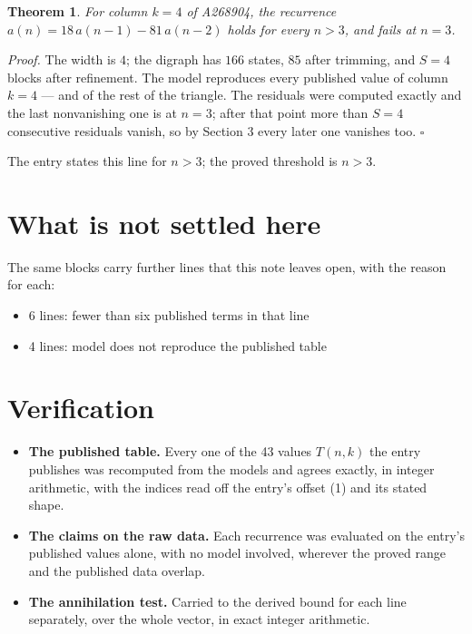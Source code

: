 \documentclass[11pt]{article}
\newtheorem{theorem}{Theorem}
\theoremstyle{definition}
\begin{document}
\begin{theorem} For column $k = 4$ of A268904, the recurrence $a(n) = 18\,a(n-1) - 81\,a(n-2)$ holds for every $n > 3$, and fails at $n = 3$.\end{theorem}

{\itshape Proof.} The width is $4$; the digraph has $166$ states, $85$ after trimming, and $S = 4$ blocks after refinement. The model reproduces every published value of column $k = 4$ --- and of the rest of the triangle. The residuals were computed exactly and the last nonvanishing one is at $n = 3$; after that point more than $S = 4$ consecutive residuals vanish, so by Section 3 every later one vanishes too. $\square$

The entry states this line for $n > 3$; the proved threshold is $n > 3$.

\section{What is not settled here}

The same blocks carry further lines that this note leaves open, with the reason for each:

\begin{itemize}

\item 6 lines: fewer than six published terms in that line

\item 4 lines: model does not reproduce the published table

\end{itemize}

\section{Verification}

\begin{itemize}

\item {\bfseries The published table.} Every one of the 43 values $T(n,k)$ the entry publishes was recomputed from the models and agrees exactly, in integer arithmetic, with the indices read off the entry's offset (1) and its stated shape.

\item {\bfseries The claims on the raw data.} Each recurrence was evaluated on the entry's published values alone, with no model involved, wherever the proved range and the published data overlap.

\item {\bfseries The annihilation test.} Carried to the derived bound for each line separately, over the whole vector, in exact integer arithmetic.

\end{itemize}
\end{document}
